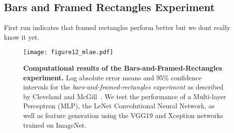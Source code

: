 \subsection{Bars and Framed Rectangles Experiment}

First run indicates that framed rectangles perform better but we dont really know it yet.

\begin{figure*}[t]
	  \texttt{[image: figure12\_mlae.pdf]}
  \caption{\textbf{Computational results of the Bars-and-Framed-Rectangles experiment.} Log absolute error means and 95\% confidence intervals for the \emph{bars-and-framed-rectangles experiment} as described by Cleveland and McGill~\cite{cleveland_mcgill}. We test the performance of a Multi-layer Perceptron (MLP), the LeNet Convolutional Neural Network, as well as feature generation using the VGG19 and Xception networks trained on ImageNet.}
	\label{fig:figure12_mlae}
\end{figure*}

